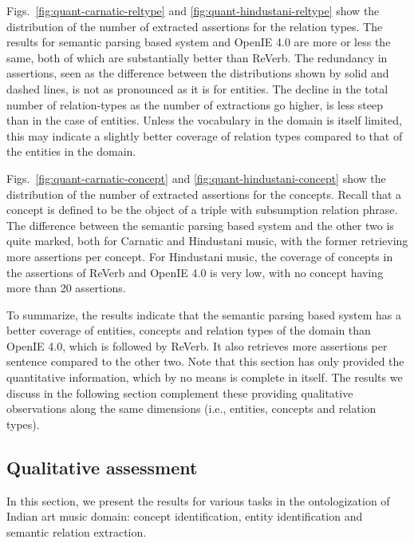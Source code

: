 \documentclass{llncs}
\begin{document}
Figs.~\ref{fig:quant-carnatic-reltype} and \ref{fig:quant-hindustani-reltype} show the distribution of the number of extracted assertions for the relation types. The results for semantic parsing based system and OpenIE 4.0 are more or less the same, both of which are substantially better than ReVerb. The redundancy in assertions, seen as the difference between the distributions shown by solid and dashed lines, is not as pronounced as it is for entities. The decline in the total number of relation-types as the number of extractions go higher, is less steep than in the case of entities. Unless the vocabulary in the domain is itself limited, this may indicate a slightly better coverage of relation types compared to that of the entities in the domain.


Figs.~\ref{fig:quant-carnatic-concept} and \ref{fig:quant-hindustani-concept} show the distribution of the number of extracted assertions for the concepts. Recall that a concept is defined to be the object of a triple with subsumption relation phrase. The difference between the semantic parsing based system and the other two is quite marked, both for Carnatic and Hindustani music, with the former retrieving more assertions per concept. For Hindustani music, the coverage of concepts in the assertions of ReVerb and OpenIE 4.0 is very low, with no concept having more than 20 assertions.

To summarize, the results indicate that the semantic parsing based system has a better coverage of entities, concepts and relation types of the domain than OpenIE 4.0, which is followed by ReVerb. It also retrieves more assertions per sentence compared to the other two. Note that this section has only provided the quantitative information, which by no means is complete in itself. The results we discuss in the following section complement these providing qualitative observations along the same dimensions (i.e., entities, concepts and relation types).

\subsection{Qualitative assessment}
In this section, we present the results for various tasks in the ontologization of Indian art music domain: concept identification, entity identification and semantic relation extraction.
\end{document}
